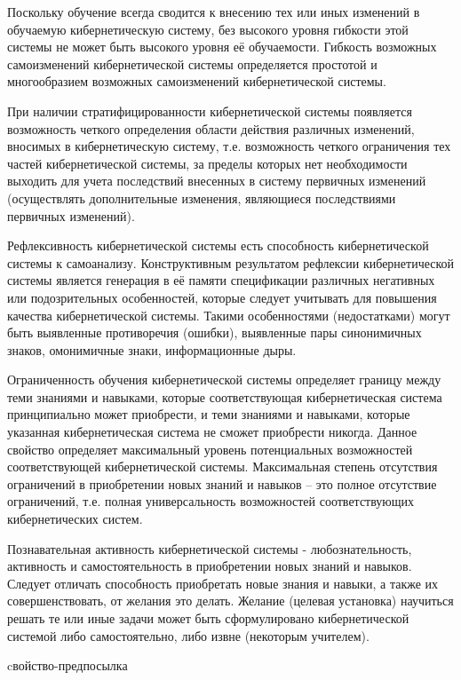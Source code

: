 Поскольку обучение всегда сводится к внесению тех или иных изменений в обучаемую кибернетическую систему, без высокого уровня гибкости этой системы не может быть высокого уровня её обучаемости.
Гибкость возможных самоизменений кибернетической системы определяется простотой и многообразием возможных самоизменений кибернетической системы.

При наличии стратифицированности кибернетической системы появляется возможность четкого определения области действия различных изменений, вносимых в кибернетическую систему, т.е. возможность четкого ограничения тех частей кибернетической системы, за пределы которых нет необходимости выходить для учета последствий внесенных в систему первичных изменений (осуществлять дополнительные изменения, являющиеся последствиями первичных изменений).

Рефлексивность кибернетической системы есть способность кибернетической системы к самоанализу.
Конструктивным результатом рефлексии кибернетической системы является генерация в её памяти спецификации различных негативных или подозрительных особенностей, которые следует учитывать для повышения качества кибернетической системы.
Такими особенностями (недостатками) могут быть выявленные противоречия (ошибки), выявленные пары синонимичных знаков, омонимичные знаки, информационные дыры.

Ограниченность обучения кибернетической системы определяет границу между теми знаниями и навыками, которые соответствующая кибернетическая система принципиально может приобрести, и теми знаниями и навыками, которые указанная кибернетическая система не сможет приобрести никогда.
Данное свойство определяет максимальный уровень потенциальных возможностей соответствующей кибернетической системы.
Максимальная степень отсутствия ограничений в приобретении новых знаний и навыков – это полное отсутствие ограничений, т.е. полная универсальность возможностей соответствующих кибернетических систем.

Познавательная активность кибернетической системы - любознательность, активность и самостоятельность в приобретении новых знаний и навыков.
Следует отличать способность приобретать новые знания и навыки, а также их совершенствовать, от желания это делать.
Желание (целевая установка) научиться решать те или иные задачи может быть сформулировано кибернетической системой либо самостоятельно, либо извне (некоторым учителем).

\begin{SCn}
\begin{scnrelfromlist}{cвойство-предпосылка}
\end{scnrelfromlist}
\end{SCn}

